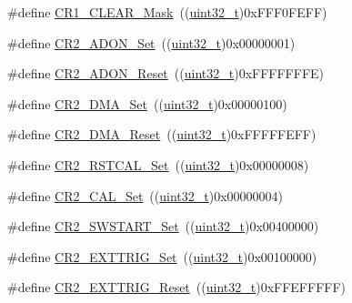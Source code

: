 \begin{DoxyCompactItemize}
\item 
\#define \hyperlink{group___a_d_c___private___defines_ga67f7dd35ea3d1296677e5fc50b88fa90}{C\+R1\+\_\+\+C\+L\+E\+A\+R\+\_\+\+Mask}~((\hyperlink{_p_e___types_8h_a33594304e786b158f3fb30289278f5af}{uint32\+\_\+t})0x\+F\+F\+F0\+F\+E\+F\+F)
\item 
\#define \hyperlink{group___a_d_c___private___defines_ga21779759f3d5d1389b114d7a1bb6fca1}{C\+R2\+\_\+\+A\+D\+O\+N\+\_\+\+Set}~((\hyperlink{_p_e___types_8h_a33594304e786b158f3fb30289278f5af}{uint32\+\_\+t})0x00000001)
\item 
\#define \hyperlink{group___a_d_c___private___defines_gaa3eb5d77998387159508a57d7e09f459}{C\+R2\+\_\+\+A\+D\+O\+N\+\_\+\+Reset}~((\hyperlink{_p_e___types_8h_a33594304e786b158f3fb30289278f5af}{uint32\+\_\+t})0x\+F\+F\+F\+F\+F\+F\+F\+E)
\item 
\#define \hyperlink{group___a_d_c___private___defines_ga7fa8ba27f5b249dd7cb0b6e53a25d6e2}{C\+R2\+\_\+\+D\+M\+A\+\_\+\+Set}~((\hyperlink{_p_e___types_8h_a33594304e786b158f3fb30289278f5af}{uint32\+\_\+t})0x00000100)
\item 
\#define \hyperlink{group___a_d_c___private___defines_ga8e674886185af86bc17d9266ddbdca7c}{C\+R2\+\_\+\+D\+M\+A\+\_\+\+Reset}~((\hyperlink{_p_e___types_8h_a33594304e786b158f3fb30289278f5af}{uint32\+\_\+t})0x\+F\+F\+F\+F\+F\+E\+F\+F)
\item 
\#define \hyperlink{group___a_d_c___private___defines_gaf256d4606fbe82d7e4cdc8d177653b53}{C\+R2\+\_\+\+R\+S\+T\+C\+A\+L\+\_\+\+Set}~((\hyperlink{_p_e___types_8h_a33594304e786b158f3fb30289278f5af}{uint32\+\_\+t})0x00000008)
\item 
\#define \hyperlink{group___a_d_c___private___defines_ga6705aae168367a2d961e64dd9137ae3a}{C\+R2\+\_\+\+C\+A\+L\+\_\+\+Set}~((\hyperlink{_p_e___types_8h_a33594304e786b158f3fb30289278f5af}{uint32\+\_\+t})0x00000004)
\item 
\#define \hyperlink{group___a_d_c___private___defines_gac40733c6a8918c16cd52fcade75a6de6}{C\+R2\+\_\+\+S\+W\+S\+T\+A\+R\+T\+\_\+\+Set}~((\hyperlink{_p_e___types_8h_a33594304e786b158f3fb30289278f5af}{uint32\+\_\+t})0x00400000)
\item 
\#define \hyperlink{group___a_d_c___private___defines_gaf39824995dbcbabf76697cd7116352d6}{C\+R2\+\_\+\+E\+X\+T\+T\+R\+I\+G\+\_\+\+Set}~((\hyperlink{_p_e___types_8h_a33594304e786b158f3fb30289278f5af}{uint32\+\_\+t})0x00100000)
\item 
\#define \hyperlink{group___a_d_c___private___defines_ga8a96cb9aac77bab199f3dff54da230a6}{C\+R2\+\_\+\+E\+X\+T\+T\+R\+I\+G\+\_\+\+Reset}~((\hyperlink{_p_e___types_8h_a33594304e786b158f3fb30289278f5af}{uint32\+\_\+t})0x\+F\+F\+E\+F\+F\+F\+F\+F)

\end{DoxyCompactItemize}
